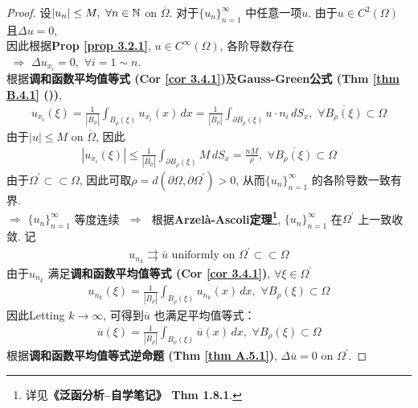 \begin{thm}
		\begin{proof}
			设$| u_n | \leq M , \,\, \forall n \in \mathbb{N}$ on $\overline{\Omega}$. 对于$\{ u_n \}_{n = 1}^\infty$ 中任意一项$u$. 由于$u \in C^2(\Omega)$ 且$\Delta u = 0$, \\
			因此根据\textbf{Prop \ref{prop 3.2.1}}, $u \in C^{\infty}(\Omega)$, 各阶导数存在 $\,\, \Rightarrow \,\, \Delta u_{x_i} = 0 , \,\, \forall i = 1 \sim n$. \\
			根据\textbf{调和函数平均值等式 (Cor \ref{cor 3.4.1})}及\textbf{Gauss-Green公式 (Thm \ref{thm B.4.1} ())}, 
			\begin{align*}
				u_{x_i}(\xi) 
				= \frac{1}{| B_\rho |} \int_{B_{\rho}(\xi)} u_{x_i}(x) \, dx 
				= \frac{1}{| B_\rho |} \int_{\partial B_{\rho}(\xi)} u \cdot n_i \, dS_x , \,\, \forall \overline{B_{\rho}(\xi)} \subset \Omega
			\end{align*}
			由于$| u | \leq M$ on $\overline{\Omega}$, 因此
			\begin{align*}
				| u_{x_i} (\xi) | 
				\leq \frac{1}{| B_\rho |} \int_{\partial B_\rho(\xi)} M \, dS_x 
				= \frac{n M}{\rho} , \,\, \forall \overline{B_{\rho}(\xi)} \subset \Omega
			\end{align*}
			由于$\Omega^{'} \subset\subset \Omega$, 因此可取$\rho = d(\partial \Omega , \partial \Omega^{'}) > 0$, 从而$\{ u_n \}_{n = 1}^{\infty}$ 的各阶导数一致有界. \\
			$\Rightarrow \,\, \{ u_n \}_{n = 1}^{\infty}$ 等度连续 $\,\, \Rightarrow \,\,$ 根据\textbf{Arzel\`{a}-Ascoli定理\footnote{详见\textbf{《泛函分析--自学笔记》 Thm 1.8.1}. }}, $\{ u_n \}_{n = 1}^{\infty}$ 在$\Omega^{'}$ 上一致收敛. 记
			\begin{align*}
				u_{n_k} \rightrightarrows \overline{u} \,\, \text{uniformly on} \,\, \Omega^{'} \subset \subset \Omega
			\end{align*}
			由于$u_{n_k}$ 满足\textbf{调和函数平均值等式 (Cor \ref{cor 3.4.1})}, $\forall \xi \in \Omega^{'}$
			\begin{align*}
				u_{n_k}(\xi) = \frac{1}{| B_\rho |} \int_{B_{\rho}(\xi)} u_{n_k}(x) \, dx , \,\, \forall B_{\rho}(\xi) \subset \Omega
			\end{align*}
			因此Letting $k \to \infty$, 可得到$\overline{u}$ 也满足平均值等式：
			\begin{align*}
				\overline{u}(\xi) = \frac{1}{| B_\rho |} \int_{B_{\rho}(\xi)} \overline{u}(x) \, dx , \,\, \forall B_{\rho}(\xi) \subset \Omega
			\end{align*}
			根据\textbf{调和函数平均值等式逆命题 (Thm \ref{thm A.5.1})}, $\Delta \overline{u} = 0$ on $\Omega^{'}$. 
		\end{proof}
	\end{thm}

